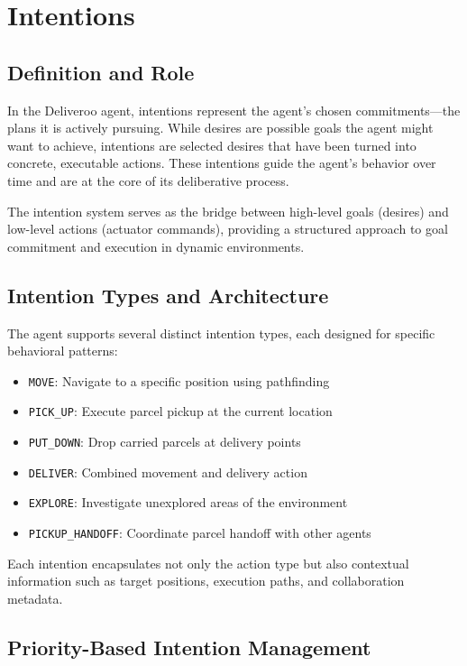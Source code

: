 \section{Intentions}

\subsection{Definition and Role}

In the Deliveroo agent, intentions represent the agent's chosen commitments—the plans it is actively pursuing. While desires are possible goals the agent might want to achieve, intentions are selected desires that have been turned into concrete, executable actions. These intentions guide the agent's behavior over time and are at the core of its deliberative process.

The intention system serves as the bridge between high-level goals (desires) and low-level actions (actuator commands), providing a structured approach to goal commitment and execution in dynamic environments.

\subsection{Intention Types and Architecture}

The agent supports several distinct intention types, each designed for specific behavioral patterns:

\begin{itemize}
    \item \texttt{MOVE}: Navigate to a specific position using pathfinding
    \item \texttt{PICK\_UP}: Execute parcel pickup at the current location
    \item \texttt{PUT\_DOWN}: Drop carried parcels at delivery points
    \item \texttt{DELIVER}: Combined movement and delivery action
    \item \texttt{EXPLORE}: Investigate unexplored areas of the environment
    \item \texttt{PICKUP\_HANDOFF}: Coordinate parcel handoff with other agents
\end{itemize}

Each intention encapsulates not only the action type but also contextual information such as target positions, execution paths, and collaboration metadata.

\subsection{Priority-Based Intention Management}

